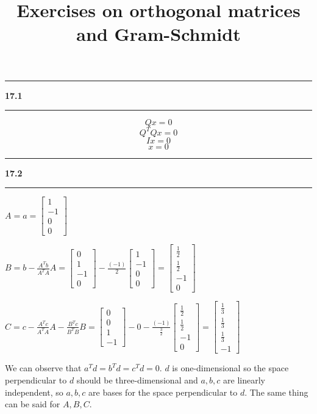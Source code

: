 \documentclass[11pt]{article}
\newcommand\question[2]{\vspace{.25in}\hrule\textbf{#1 #2}\vspace{.5em}\hrule\vspace{.10in}}
\begin{document}
\raggedright
\newcommand\NAME{Haiying Cui}  %
\newcommand\ANDREWID{Christy}     %
\newcommand\HWNUM{17}              %

\title{Exercises on orthogonal matrices and Gram-Schmidt}
\maketitle

\question{17.1}{}
$$Qx = 0$$
$$Q^TQx = 0$$
$$Ix = 0$$
$$x = 0$$
\question{17.2}{}
\(A = a = \begin{bmatrix} 1 \\ -1 \\ 0 \\ 0 \end{bmatrix}\)

\(B = b - \frac{A^Tb}{A^TA}A = \begin{bmatrix} 0 \\ 1 \\ -1 \\ 0 \end{bmatrix} - \frac{(-1)}{2}\begin{bmatrix} 1 \\ -1 \\ 0 \\ 0 \end{bmatrix} = \begin{bmatrix} \frac{1}{2} \\ \frac{1}{2} \\ -1 \\ 0 \end{bmatrix}\)

\(C = c - \frac{A^Tc}{A^TA}A - \frac{B^Tc}{B^TB}B = \begin{bmatrix} 0 \\ 0 \\ 1 \\ -1 \end{bmatrix} - 0 - \frac{(-1)}{\frac{3}{2}}\begin{bmatrix} \frac{1}{2} \\ \frac{1}{2} \\ -1 \\ 0 \end{bmatrix} = \begin{bmatrix} \frac{1}{3} \\ \frac{1}{3} \\ \frac{1}{3} \\ -1 \end{bmatrix}\)

We can observe that \(a^Td = b^Td = c^Td = 0\). \(d\) is one-dimensional so the space perpendicular to \(d\) should be three-dimensional and \(a, b, c\) are linearly independent, so \(a, b, c\) are bases for the space perpendicular to \(d\). The same thing can be said for \(A, B, C\).
\end{document}
